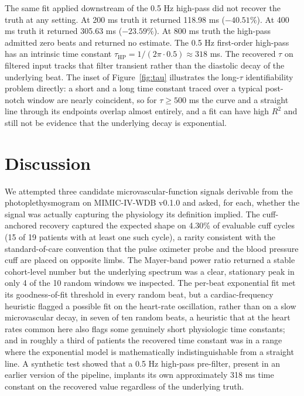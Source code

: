 \documentclass[twocolumn,letterpaper,10pt]{article}
\begin{document}
The same fit applied downstream of the 0.5 Hz high-pass did not recover the truth at any setting. At 200 ms truth it returned 118.98 ms ($-40.51\%$). At 400 ms truth it returned 305.63 ms ($-23.59\%$). At 800 ms truth the high-pass admitted zero beats and returned no estimate. The 0.5 Hz first-order high-pass has an intrinsic time constant $\tau_{\mathrm{HP}} = 1/(2\pi \cdot 0.5) \approx 318$ ms. The recovered $\tau$ on filtered input tracks that filter transient rather than the diastolic decay of the underlying beat. The inset of Figure~\ref{fig:tau} illustrates the long-$\tau$ identifiability problem directly: a short and a long time constant traced over a typical post-notch window are nearly coincident, so for $\tau \geq 500$ ms the curve and a straight line through its endpoints overlap almost entirely, and a fit can have high $R^2$ and still not be evidence that the underlying decay is exponential.

\section{Discussion}

We attempted three candidate microvascular-function signals derivable from the photoplethysmogram on MIMIC-IV-WDB v0.1.0 and asked, for each, whether the signal was actually capturing the physiology its definition implied. The cuff-anchored recovery captured the expected shape on 4.30\% of evaluable cuff cycles (15 of 19 patients with at least one such cycle), a rarity consistent with the standard-of-care convention that the pulse oximeter probe and the blood pressure cuff are placed on opposite limbs. The Mayer-band power ratio returned a stable cohort-level number but the underlying spectrum was a clear, stationary peak in only 4 of the 10 random windows we inspected. The per-beat exponential fit met its goodness-of-fit threshold in every random beat, but a cardiac-frequency heuristic flagged a possible fit on the heart-rate oscillation, rather than on a slow microvascular decay, in seven of ten random beats, a heuristic that at the heart rates common here also flags some genuinely short physiologic time constants; and in roughly a third of patients the recovered time constant was in a range where the exponential model is mathematically indistinguishable from a straight line. A synthetic test showed that a 0.5 Hz high-pass pre-filter, present in an earlier version of the pipeline, implants its own approximately 318 ms time constant on the recovered value regardless of the underlying truth.
\end{document}
